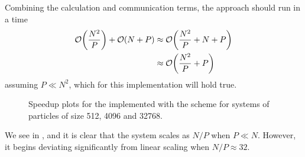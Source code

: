 Combining the calculation and communication terms, the \systolicloop{} approach
should run in a time
\begin{align}
    \mathcal{O}{\left({ \frac{N^2}{P} }\right)} + \mathcal{O}{\left({ N + P }\right)}
        &\approx{} \mathcal{O}{\left({ \frac{N^2}{P} + N + P }\right)} \\
        &\approx{} \mathcal{O}{\left({ \frac{N^2}{P} + P }\right)}
\end  {align}
assuming $P \ll{} N^2$, which for this implementation will hold true.

%
%
\begin{figure}[!h]
    
    \caption{
        Speedup plots for the \pairoperation{} implemented with the \systolicloop{} scheme for systems of particles of size 512, 4096 and 32768.
    }
    \label{fig:v0_systolic_pair_operation_speedups}
\end{figure}


%
%
\begin{figure}[!h]
    
    \caption{}
    \label{fig:v0_systolic_pair_operation_512_logtime}
\end  {figure}

\begin{figure}[!h]
    
    \caption{}
    \label{fig:v0_systolic_pair_operation_4096_logtime}
\end  {figure}

\begin{figure}[!h]
    
    \caption{}
    \label{fig:v0_systolic_pair_operation_32768_logtime}
\end  {figure}

\vZeroTimeExplanation
{}
{}
{}
{\pairoperation{}}
{\systolicloop{}}

We see in 
,
 and
it is clear that the system scales as $N/P$ when $P \ll{} N$.
%
However, it begins deviating significantly from linear scaling
when $N/P \approx{} 32$.

